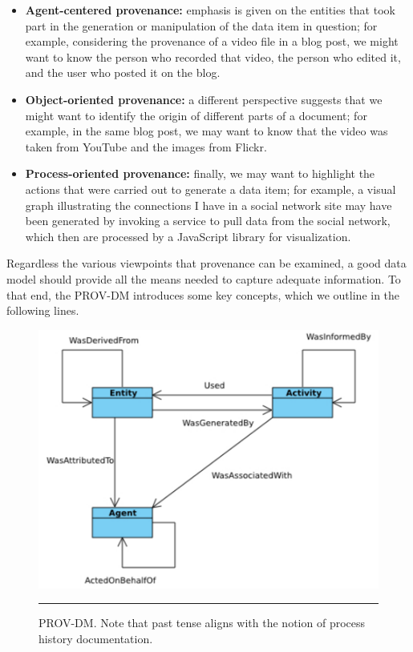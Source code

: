 \begin{itemize}
  \item
        \textbf{Agent-centered provenance:} emphasis is given on the entities that took part in the generation or manipulation of the data item in question; for example, considering the provenance of a video file in a blog post, we might want to know the person who recorded that video, the person who edited it, and the user who posted it on the blog.
  \item
        \textbf{Object-oriented provenance:} a different perspective suggests that we might want to identify the origin of different parts of a document; for example, in the same blog post, we may want to know that the video was taken from YouTube and the images from Flickr.
  \item \textbf{Process-oriented provenance:} finally, we may want to highlight the actions that were carried out to generate a data item; for example, a visual graph illustrating the connections I have in a social network site may have been generated by invoking a service to pull data from the social network, which then are processed by a JavaScript library for visualization.
\end{itemize}

Regardless the various viewpoints that provenance can be examined, a good data model should provide all the means needed to capture adequate information. To that end, the PROV-DM introduces some key concepts, which we outline in the following lines.

\begin{figure}[htbp]
	\centering
		\includegraphics[scale=0.90]{./Figures/chapter2/figure8.pdf}
		\rule{35em}{0.5pt}
	\caption[PROV-DM]{PROV-DM\cite{reference14}. Note that past tense aligns with the notion of process history documentation.}
	\label{fig:provDM}
\end{figure}

